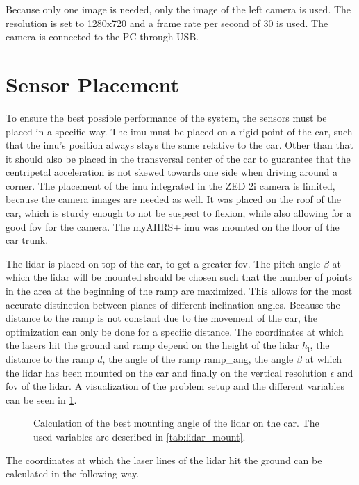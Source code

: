 Because only one image is needed, only the image of the left camera is used.
The resolution is set to 1280x720 and a frame rate per second of 30 is used.
The camera is connected to the PC through USB.



\section{Sensor Placement}
To ensure the best possible performance of the system, the sensors must be placed in a specific way.
The \gls{imu} must be placed on a rigid point of the car, such that the \gls{imu}'s position always stays the same relative to the car.
Other than that it should also be placed in the transversal center of the car to guarantee that the centripetal acceleration is not skewed towards one side when driving around a corner.
The placement of the \gls{imu} integrated in the ZED 2i camera is limited, because the camera images are needed as well.
It was placed on the roof of the car, which is sturdy enough to not be suspect to flexion, while also allowing for a good \gls{fov} for the camera.
The myAHRS+ \gls{imu} was mounted on the floor of the car trunk.

The \gls{lidar} is placed on top of the car, to get a greater \gls{fov}.
The pitch angle $\beta$ at which the \gls{lidar} will be mounted should be chosen such that the number of points in the area at the beginning of the ramp are maximized.
This allows for the most accurate distinction between planes of different inclination angles.
Because the distance to the ramp is not constant due to the movement of the car, the optimization can only be done for a specific distance.
The coordinates at which the lasers hit the ground and ramp depend on the height of the \gls{lidar} $h_\mathrm{l}$, the distance to the ramp $d$, the angle of the ramp \gls{ramp_ang}, the angle $\beta$ at which the \gls{lidar} has been mounted on the car and finally on the vertical resolution $\epsilon$ and \gls{fov} of the \gls{lidar}.
A visualization of the problem setup and the different variables can be seen in \cref{fig:tikz_lidar_mount}.
\begin{figure}[t]
    \centering
    
    \caption[ placement on the car]{Calculation of the best mounting angle of the \acrshort{lidar} on the car. The used variables are described in \cref{tab:lidar_mount}.}
    \label{fig:tikz_lidar_mount}
\end{figure}
The coordinates at which the laser lines of the \gls{lidar} hit the ground can be calculated in the following way.

